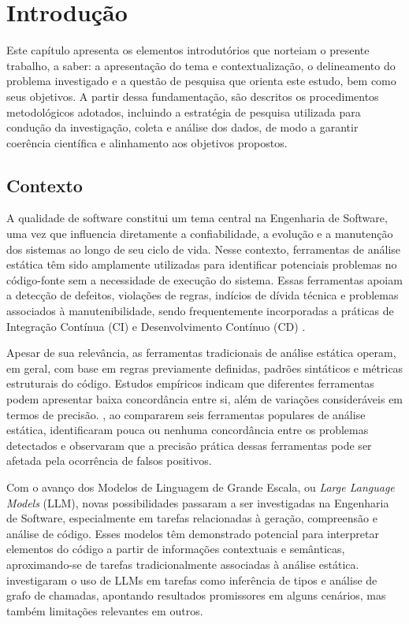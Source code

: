 \chapter[Introdução]{Introdução}

Este capítulo apresenta os elementos introdutórios que norteiam o presente trabalho, a saber: a apresentação do tema e contextualização, o delineamento do problema investigado e a questão de pesquisa que orienta este estudo, bem como seus objetivos. A partir dessa fundamentação, são descritos os procedimentos metodológicos adotados, incluindo a estratégia de pesquisa utilizada para condução da investigação, coleta e análise dos dados, de modo a garantir coerência científica e alinhamento aos objetivos propostos.

\section{Contexto}

A qualidade de software constitui um tema central na Engenharia de Software, uma vez que influencia diretamente a confiabilidade, a evolução e a manutenção dos sistemas ao longo de seu ciclo de vida. Nesse contexto, ferramentas de análise estática têm sido amplamente utilizadas para identificar potenciais problemas no código-fonte sem a necessidade de execução do sistema. Essas ferramentas apoiam a detecção de defeitos, violações de regras, indícios de dívida técnica e problemas associados à manutenibilidade, sendo frequentemente incorporadas a práticas de Integração Contínua (CI) e Desenvolvimento Contínuo (CD) \cite{LenarduzziEtAll}.

Apesar de sua relevância, as ferramentas tradicionais de análise estática operam, em geral, com base em regras previamente definidas, padrões sintáticos e métricas estruturais do código. Estudos empíricos indicam que diferentes ferramentas podem apresentar baixa concordância entre si, além de variações consideráveis em termos de precisão. , ao compararem seis ferramentas populares de análise estática, identificaram pouca ou nenhuma concordância entre os problemas detectados e observaram que a precisão prática dessas ferramentas pode ser afetada pela ocorrência de falsos positivos.

Com o avanço dos Modelos de Linguagem de Grande Escala, ou \textit{Large Language Models} (LLM), novas possibilidades passaram a ser investigadas na Engenharia de Software, especialmente em tarefas relacionadas à geração, compreensão e análise de código. Esses modelos têm demonstrado potencial para interpretar elementos do código a partir de informações contextuais e semânticas, aproximando-se de tarefas tradicionalmente associadas à análise estática.  investigaram o uso de LLMs em tarefas como inferência de tipos e análise de grafo de chamadas, apontando resultados promissores em alguns cenários, mas também limitações relevantes em outros.


